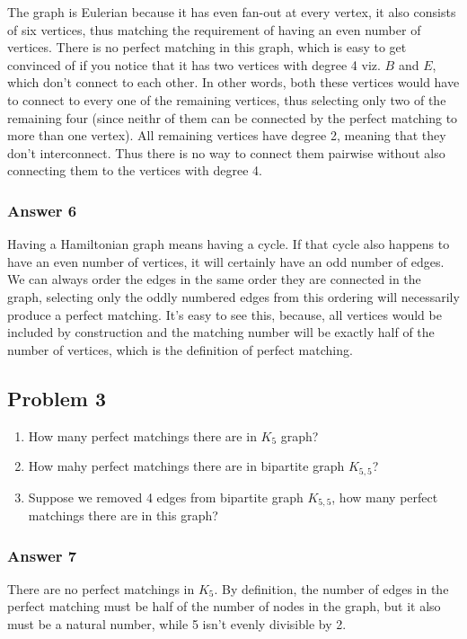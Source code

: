 \documentclass[11pt]{article}
\begin{document}
The graph is Eulerian because it has even fan-out at every vertex, it also
consists of six vertices, thus matching the requirement of having an even
number of vertices.  There is no perfect matching in this graph, which is
easy to get convinced of if you notice that it has two vertices with degree
4 viz. \(B\) and \(E\), which don't connect to each other.  In other words, both
these vertices would have to connect to every one of the remaining vertices,
thus selecting only two of the remaining four (since neithr of them can be
connected by the perfect matching to more than one vertex).  All remaining
vertices have degree 2, meaning that they don't interconnect.  Thus there is
no way to connect them pairwise without also connecting them to the vertices
with degree 4.

\subsubsection{Answer 6}
\label{sec:orgheadline7}
Having a Hamiltonian graph means having a cycle. If that cycle also happens
to have an even number of vertices, it will certainly have an odd number of
edges.  We can always order the edges in the same order they are connected
in the graph, selecting only the oddly numbered edges from this ordering will
necessarily produce a perfect matching.  It's easy to see this, because, all
vertices would be included by construction and the matching number will be
exactly half of the number of vertices, which is the definition of perfect
matching.

\subsection{Problem 3}
\label{sec:orgheadline12}
\begin{enumerate}
\item How many perfect matchings there are in \(K_5\) graph?
\item How mahy perfect matchings there are in bipartite graph \(K_{5, 5}\)?
\item Suppose we removed 4 edges from bipartite graph \(K_{5, 5}\), how many
perfect matchings there are in this graph?
\end{enumerate}

\subsubsection{Answer 7}
\label{sec:orgheadline9}
There are no perfect matchings in \(K_5\).  By definition, the number of edges
in the perfect matching must be half of the number of nodes in the graph,
but it also must be a natural number, while 5 isn't evenly divisible by 2.
\end{document}
